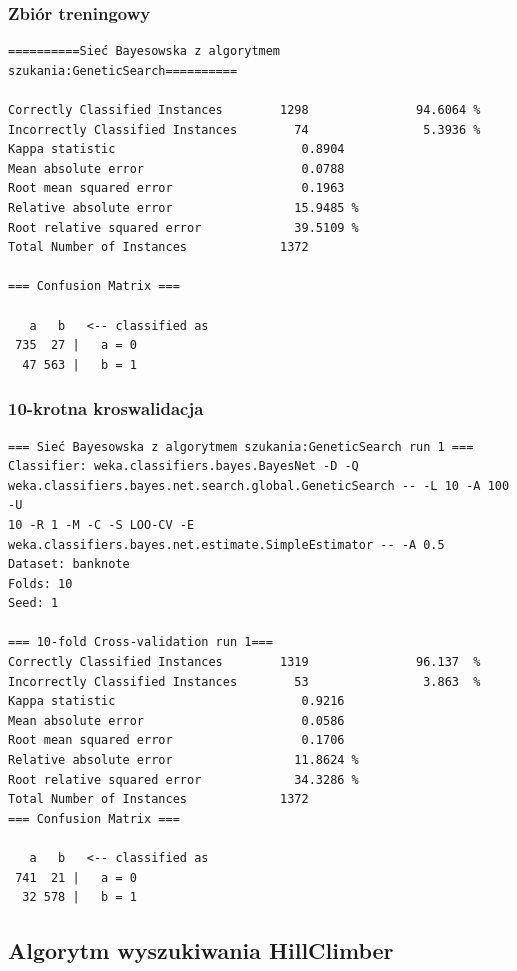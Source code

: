 \documentclass{classrep}
\begin{document}
\subsubsection*{Zbiór treningowy}
\scriptsize 
\begin{verbatim}
==========Sieć Bayesowska z algorytmem szukania:GeneticSearch==========

Correctly Classified Instances        1298               94.6064 %
Incorrectly Classified Instances        74                5.3936 %
Kappa statistic                          0.8904
Mean absolute error                      0.0788
Root mean squared error                  0.1963
Relative absolute error                 15.9485 %
Root relative squared error             39.5109 %
Total Number of Instances             1372     

=== Confusion Matrix ===

   a   b   <-- classified as
 735  27 |   a = 0
  47 563 |   b = 1
\end{verbatim} 
\normalsize
\subsubsection*{10-krotna kroswalidacja}
\scriptsize 
\begin{verbatim}
=== Sieć Bayesowska z algorytmem szukania:GeneticSearch run 1 ===
Classifier: weka.classifiers.bayes.BayesNet -D -Q
weka.classifiers.bayes.net.search.global.GeneticSearch -- -L 10 -A 100 -U
10 -R 1 -M -C -S LOO-CV -E weka.classifiers.bayes.net.estimate.SimpleEstimator -- -A 0.5
Dataset: banknote
Folds: 10
Seed: 1

=== 10-fold Cross-validation run 1===
Correctly Classified Instances        1319               96.137  %
Incorrectly Classified Instances        53                3.863  %
Kappa statistic                          0.9216
Mean absolute error                      0.0586
Root mean squared error                  0.1706
Relative absolute error                 11.8624 %
Root relative squared error             34.3286 %
Total Number of Instances             1372     
=== Confusion Matrix ===

   a   b   <-- classified as
 741  21 |   a = 0
  32 578 |   b = 1
\end{verbatim} 
\normalsize

\subsection{Algorytm wyszukiwania HillClimber}
\end{document}

